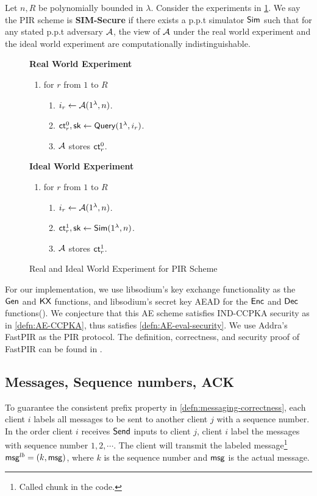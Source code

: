 \begin{definition}
\label{defn:PIR-SIM-security}
Let $n, R$ be polynomially bounded in $\lambda$. Consider the experiments in \cref{expr:pir-real-ideal-world}. We say the PIR scheme is \textbf{SIM-Secure} if there exists a p.p.t simulator $\mathsf{Sim}$ such that for any stated p.p.t adversary $\mathcal{A}$, the view of $\mathcal{A}$ under the real world experiment and the ideal world experiment are computationally indistinguishable. 

\begin{figure}[h!]
\begin{framed}
\textbf{Real World Experiment}
\begin{enumerate}
    \item for $r$ from $1$ to $R$
    \begin{enumerate}
        \item $i_r \leftarrow \mathcal{A}(1^{\lambda}, n)$.
        \item $\mathsf{ct}_r^0, {\mathsf{sk}} \leftarrow \mathsf{Query}(1^{\lambda}, i_r)$.
        \item $\mathcal{A}$ stores $\mathsf{ct}_r^0$.
    \end{enumerate}
\end{enumerate}
\textbf{Ideal World Experiment}
\begin{enumerate}
    \item for $r$ from $1$ to $R$
    \begin{enumerate}
        \item $i_r \leftarrow \mathcal{A}(1^{\lambda}, n)$.
        \item $\mathsf{ct}_r^1, {\mathsf{sk}} \leftarrow \mathsf{Sim}(1^{\lambda}, n)$.
        \item $\mathcal{A}$ stores $\mathsf{ct}_r^1$.
    \end{enumerate}
\end{enumerate}
\end{framed}
\caption{Real and Ideal World Experiment for PIR Scheme}
\label{expr:pir-real-ideal-world}
\end{figure}
\end{definition}
For our implementation, we use libsodium's key exchange functionality as the $\mathsf{Gen}$ and $\mathsf{KX}$ functions, and libsodium's secret key AEAD for the $\mathsf{Enc}$ and $\mathsf{Dec}$ functions(\cite{libsodium}). We conjecture that this AE scheme satisfies IND-CCPKA security as in \cref{defn:AE-CCPKA}, thus satisfies \cref{defn:AE-eval-security}. We use Addra's FastPIR as the PIR protocol. The definition, correctness, and security proof of FastPIR can be found in \cite[Section 4]{ahmad2021addra}.
\subsection{Messages, Sequence numbers, ACK}
To guarantee the consistent prefix property in \cref{defn:messaging-correctness}, each client $i$ labels all messages to be sent to another client $j$ with a sequence number. In the order client $i$ receives $\mathsf{Send}$ inputs to client $j$, client $i$ label the messages with sequence number $1,2,\cdots$. The client will transmit the labeled message\footnote{Called chunk in the code.} $\mathsf{msg}^{lb} = (k, \mathsf{msg})$, where $k$ is the sequence number and $\mathsf{msg}$ is the actual message. 

